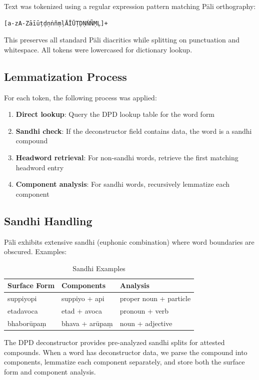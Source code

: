 \documentclass[unnumsec,webpdf,contemporary,large]{oup-authoring-template}
\begin{document}
Text was tokenized using a regular expression pattern matching Pāli orthography:

\begin{lstlisting}
[a-zA-ZāīūṭḍṇṅñṃḷĀĪŪṬḌṆṄÑṂḶ]+
\end{lstlisting}

This preserves all standard Pāli diacritics while splitting on punctuation and whitespace. All tokens were lowercased for dictionary lookup.

\subsection{Lemmatization Process}

For each token, the following process was applied:

\begin{enumerate}
\item \textbf{Direct lookup}: Query the DPD lookup table for the word form
\item \textbf{Sandhi check}: If the deconstructor field contains data, the word is a sandhi compound
\item \textbf{Headword retrieval}: For non-sandhi words, retrieve the first matching headword entry
\item \textbf{Component analysis}: For sandhi words, recursively lemmatize each component
\end{enumerate}

\subsection{Sandhi Handling}

Pāli exhibits extensive sandhi (euphonic combination) where word boundaries are obscured. Examples:

\begin{table}[h]
\centering
\caption{Sandhi Examples}
\begin{tabular}{lll}
\toprule
Surface Form & Components & Analysis \\
\midrule
suppiyopi & suppiyo + api & proper noun + particle \\
etadavoca & etad + avoca & pronoun + verb \\
bhaborūpaṃ & bhava + arūpaṃ & noun + adjective \\
\bottomrule
\end{tabular}
\end{table}

The DPD deconstructor provides pre-analyzed sandhi splits for attested compounds. When a word has deconstructor data, we parse the compound into components, lemmatize each component separately, and store both the surface form and component analysis.
\end{document}
